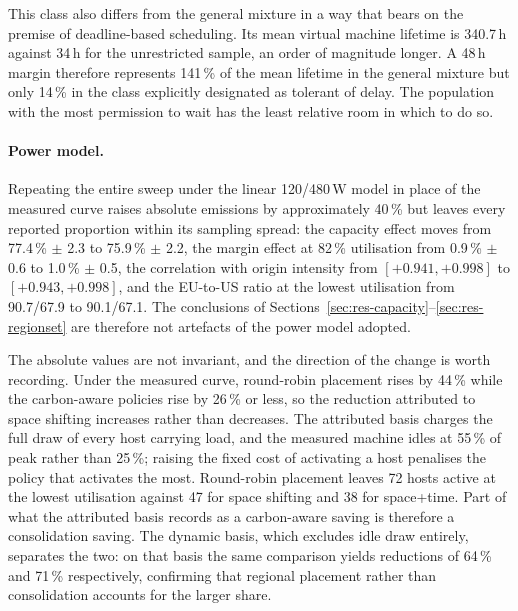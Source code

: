This class also differs from the general mixture in a way that bears on the
premise of deadline-based scheduling. Its mean virtual machine lifetime is
340.7\,h against 34\,h for the unrestricted sample, an order of magnitude
longer. A 48\,h margin therefore represents 141\,\% of the mean lifetime in the
general mixture but only 14\,\% in the class explicitly designated as tolerant
of delay. The population with the most permission to wait has the least relative
room in which to do so.

\paragraph{Power model.} Repeating the entire sweep under the linear 120/480\,W
model in place of the measured curve raises absolute emissions by approximately
40\,\% but leaves every reported proportion within its sampling spread: the
capacity effect moves from 77.4\,\% $\pm$ 2.3 to 75.9\,\% $\pm$ 2.2, the margin
effect at 82\,\% utilisation from 0.9\,\% $\pm$ 0.6 to 1.0\,\% $\pm$ 0.5, the
correlation with origin intensity from $[+0.941, +0.998]$ to
$[+0.943, +0.998]$, and the EU-to-US ratio at the lowest utilisation from
90.7/67.9 to 90.1/67.1. The conclusions of
Sections~\ref{sec:res-capacity}--\ref{sec:res-regionset} are therefore not
artefacts of the power model adopted.

The absolute values are not invariant, and the direction of the change is worth
recording. Under the measured curve, round-robin placement rises by 44\,\%
while the carbon-aware policies rise by 26\,\% or less, so the reduction
attributed to space shifting increases rather than decreases. The attributed
basis charges the full draw of every host carrying load, and the measured
machine idles at 55\,\% of peak rather than 25\,\%; raising the fixed cost of
activating a host penalises the policy that activates the most. Round-robin
placement leaves 72 hosts active at the lowest utilisation against 47 for space
shifting and 38 for space+time. Part of what the attributed basis records as a
carbon-aware saving is therefore a consolidation saving. The dynamic basis,
which excludes idle draw entirely, separates the two: on that basis the same
comparison yields reductions of 64\,\% and 71\,\% respectively, confirming that
regional placement rather than consolidation accounts for the larger share.
